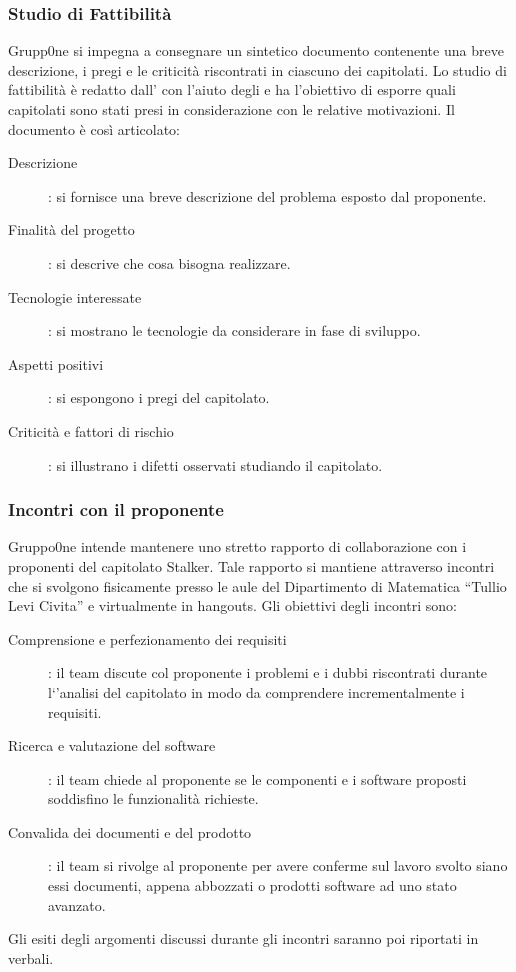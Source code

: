 \documentclass[../norme-di-progetto.tex]{subfiles}
\begin{document}
\subsubsection{Studio di Fattibilità}
\label{subs:studio di fattibilita}
Grupp0ne si impegna a consegnare un sintetico documento contenente una breve descrizione, i pregi e le criticità riscontrati in ciascuno dei capitolati. Lo studio di fattibilità è redatto dall'
con l'aiuto degli  e ha l'obiettivo di esporre quali capitolati sono stati presi in considerazione con le relative motivazioni. Il documento è così articolato:
\begin{description}
\item [Descrizione]: si fornisce una breve descrizione del problema esposto dal proponente.
\item [Finalità del progetto]: si descrive che cosa bisogna realizzare.
\item [Tecnologie interessate]: si mostrano le tecnologie da considerare in fase di sviluppo.
\item [Aspetti positivi]: si espongono i pregi del capitolato.
\item [Criticità e fattori di rischio]: si illustrano i difetti osservati studiando il capitolato.
\end{description}
\subsubsection{Incontri con il proponente}
\label{subs:incontri con il proponente}
Gruppo0ne intende mantenere uno stretto rapporto di collaborazione con i proponenti del capitolato Stalker. Tale rapporto si mantiene attraverso incontri che si svolgono fisicamente presso le aule del Dipartimento di Matematica ``Tullio Levi Civita'' e virtualmente in hangouts.
Gli obiettivi degli incontri sono:
\begin{description}
\item [Comprensione e perfezionamento dei requisiti]: il team discute col proponente i problemi e i dubbi riscontrati durante l`'analisi del capitolato in modo da comprendere incrementalmente i requisiti.
\item [Ricerca e valutazione del software]: il team chiede al proponente se le componenti e i software proposti soddisfino le funzionalità richieste.
\item [Convalida dei documenti e del prodotto]: il team si rivolge al proponente per avere conferme sul lavoro svolto siano essi documenti,  appena abbozzati o prodotti software ad uno stato avanzato.
\end{description}
Gli esiti degli argomenti discussi durante gli incontri saranno poi riportati in verbali.
\end{document}
